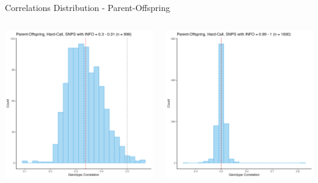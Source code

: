 \documentclass{beamer}
\begin{document}
\begin{frame}{Correlations Distribution - Parent-Offspring}
      \begin{columns}
            \begin{column}{0.5\textwidth}
                  \centering
                  \includegraphics[width= \textwidth]{fig/PO-HC-i30.png}
              \end{column}
            \begin{column}{0.5\textwidth}
                \centering
                \includegraphics[width= \textwidth]{fig/PO-HC-i99.png}
            \end{column}
        \end{columns}       
\end{frame}
\end{document}
